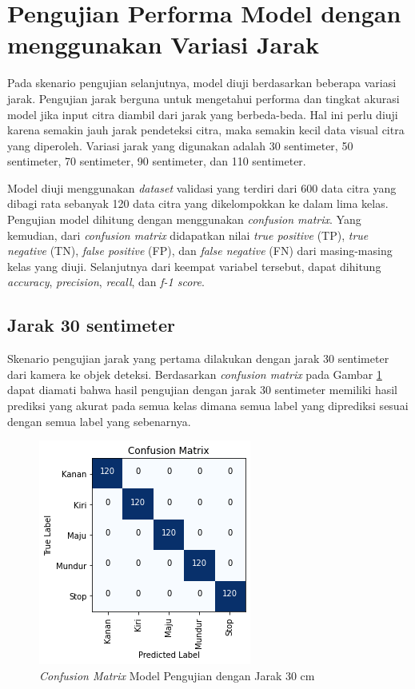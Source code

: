 \section{Pengujian Performa Model dengan menggunakan Variasi Jarak}

Pada skenario pengujian selanjutnya, model diuji berdasarkan beberapa variasi jarak. Pengujian jarak berguna untuk mengetahui performa dan tingkat akurasi model jika input citra diambil dari jarak yang berbeda-beda. Hal ini perlu diuji karena semakin jauh jarak pendeteksi citra, maka semakin kecil data visual citra yang diperoleh. Variasi jarak yang digunakan adalah 30 sentimeter, 50 sentimeter, 70 sentimeter, 90 sentimeter, dan 110 sentimeter. 

Model diuji menggunakan \emph{dataset} validasi yang terdiri dari 600 data citra yang dibagi rata sebanyak 120 data citra yang dikelompokkan ke dalam lima kelas. Pengujian model dihitung dengan menggunakan \emph{confusion matrix}. Yang kemudian, dari \emph{confusion matrix} didapatkan nilai \emph{true positive} (TP), \emph{true negative} (TN), \emph{false positive} (FP), dan \emph{false negative} (FN) dari masing-masing kelas yang diuji. Selanjutnya dari keempat variabel tersebut, dapat dihitung \emph{accuracy}, \emph{precision}, \emph{recall}, dan \emph{f-1 score}. 

\subsection{Jarak 30 sentimeter}

Skenario pengujian jarak yang pertama dilakukan dengan jarak 30 sentimeter dari kamera ke objek deteksi. Berdasarkan \emph{confusion matrix} pada Gambar \ref{fig:matrix2} dapat diamati bahwa hasil pengujian dengan jarak 30 sentimeter memiliki hasil prediksi yang akurat pada semua kelas dimana semua label yang diprediksi sesuai dengan semua label yang sebenarnya.

\begin{figure} [ht] \centering
  \includegraphics[scale=0.1]{gambar/bab4/model5 (30cm)/matrix.png}
  \caption{\emph{Confusion Matrix} Model Pengujian dengan Jarak 30 cm}
  \label{fig:matrix2}
\end{figure}



